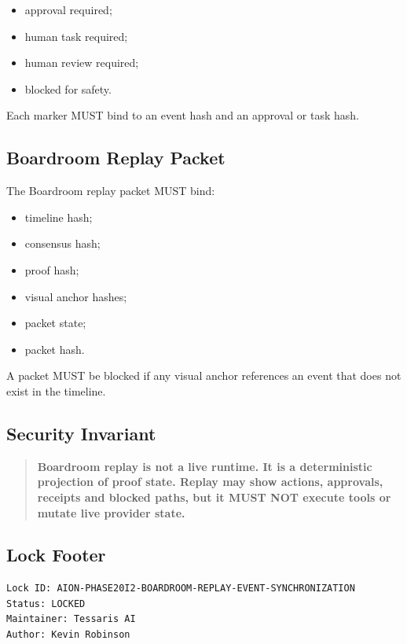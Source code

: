 \begin{itemize}
  \item approval required;
  \item human task required;
  \item human review required;
  \item blocked for safety.
\end{itemize}

Each marker MUST bind to an event hash and an approval or task hash.

\subsection{Boardroom Replay Packet}

The Boardroom replay packet MUST bind:

\begin{itemize}
  \item timeline hash;
  \item consensus hash;
  \item proof hash;
  \item visual anchor hashes;
  \item packet state;
  \item packet hash.
\end{itemize}

A packet MUST be blocked if any visual anchor references an event that does not exist in the timeline.

\subsection{Security Invariant}

\begin{quote}
\textbf{Boardroom replay is not a live runtime. It is a deterministic projection of proof state. Replay may show actions, approvals, receipts and blocked paths, but it MUST NOT execute tools or mutate live provider state.}
\end{quote}

\subsection{Lock Footer}

\begin{verbatim}
Lock ID: AION-PHASE20I2-BOARDROOM-REPLAY-EVENT-SYNCHRONIZATION
Status: LOCKED
Maintainer: Tessaris AI
Author: Kevin Robinson
\end{verbatim}
